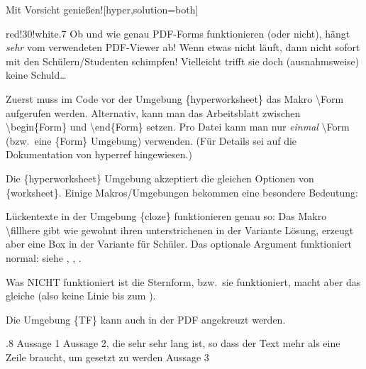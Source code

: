 \documentclass[hyperworksheet,pgfplots]{drcschool}
\newcommand*{\cs}[1]{\textup{\ttfamily\textbackslash#1}}                   %
\newcommand*{\pkg}[1]{\textup{\ttfamily#1}}                                %
\newcommand*{\env}[1]{\textup{\ttfamily\{#1\}}}                            %
\begin{document}
\Form  %
\begin{worksheet}{Mit Vorsicht genießen!}[hyper,solution=both]

\begin{center}
\begin{colorminipage}{red!30!white}{.7\linewidth}
Ob und wie genau PDF-Forms funktionieren (oder nicht), hängt \emph{sehr} vom
verwendeten PDF-Viewer ab! Wenn etwas nicht läuft, dann nicht sofort mit den
Schülern/Studenten schimpfen! Vielleicht trifft sie doch (ausnahmsweise) keine
Schuld\ldots
\end{colorminipage}
\end{center}

\noindent
Zuerst muss im Code vor der Umgebung \env{hyperworksheet} das Makro \cs{Form}
aufgerufen werden. Alternativ, kann man das Arbeitsblatt zwischen
\cs{begin\{Form\}} und \cs{end\{Form\}} setzen. Pro Datei kann man nur \emph{einmal}
\cs{Form} (bzw.~eine \env{Form} Umgebung) verwenden. (Für Details sei auf die Dokumentation
von \pkg{hyperref} hingewiesen.)

Die \env{hyperworksheet} Umgebung akzeptiert die gleichen Optionen von \env{worksheet}.
Einige Makros/Umgebungen bekommen eine besondere Bedeutung:

\exercise[Lückentexte]
\begin{cloze}
Lückentexte in der Umgebung \env{cloze} funktionieren genau so: Das Makro \cs{fillhere}
gibt wie gewohnt ihren unterstrichenen  in der Variante  Lösung,
erzeugt aber eine  Box in der Variante für Schüler.
Das optionale Argument funktioniert normal: siehe , ,
.

Was NICHT funktioniert ist die Sternform, bzw.~sie funktioniert, macht aber das gleiche
(also keine Linie bis zum ).
\end{cloze}

Die Umgebung \env{TF} kann auch in der PDF angekreuzt werden.
\begin{center}
\begin{TF}{.8\linewidth}
Aussage 1 \true
\midrule
Aussage 2, die sehr sehr lang ist, so dass der Text mehr als eine Zeile braucht, um gesetzt zu werden \false
\midrule
Aussage 3 \false
\end{TF}
\end{center}


\end{worksheet}
\end{document}
